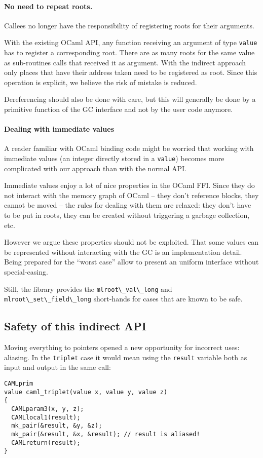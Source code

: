 \documentclass[a4paper]{easychair}
\newcommand{\cpp}[1]{\lstinline[style=C++]{#1}}
\begin{document}
\paragraph{No need to repeat roots.}

Callees no longer have the responsibility of registering roots for their arguments.

With the existing OCaml API, any function receiving an argument of type
\cpp{value} has to register a corresponding root. There are as many
roots for the same value as sub-routines calls that received it as
argument.  With the indirect approach only places that have their
address taken need to be registered as root. Since this operation is explicit, we believe the risk of mistake is reduced.

Dereferencing should also be done with care, but this will generally
be done by a primitive function of the GC interface and not by the user code anymore.

\paragraph{Dealing with immediate values}

A reader familiar with OCaml binding code might be worried that working
with immediate values (an integer directly stored in a \cpp{value})
becomes more complicated with our approach than with the normal API.

Immediate values enjoy a lot of nice properties in the OCaml FFI. Since
they do not interact with the memory graph of OCaml -- they don't reference
blocks, they cannot be moved -- the rules for dealing with them are relaxed:
they don't have to be put in roots, they can be created without triggering a
garbage collection, etc.

However we argue these properties should not be exploited. That some
values can be represented without interacting with the GC is an
implementation detail. Being prepared for the ``worst case'' allow to
present an uniform interface without special-casing.

Still, the library provides the \cpp{mlroot\_val\_long} and
\cpp{mlroot\_set\_field\_long} short-hands for cases that are known to be
safe.

\subsection{Safety of this indirect API}

Moving everything to pointers opened a new opportunity for incorrect
uses: aliasing. In the \cpp{triplet} case it would mean using the
\cpp{result} variable both as input and output in the same call:
%
\begin{lstlisting}[style=C++]
CAMLprim
value caml_triplet(value x, value y, value z)
{
  CAMLparam3(x, y, z);
  CAMLlocal1(result);
  mk_pair(&result, &y, &z);
  mk_pair(&result, &x, &result); // result is aliased!
  CAMLreturn(result);
}
\end{lstlisting}
\end{document}
